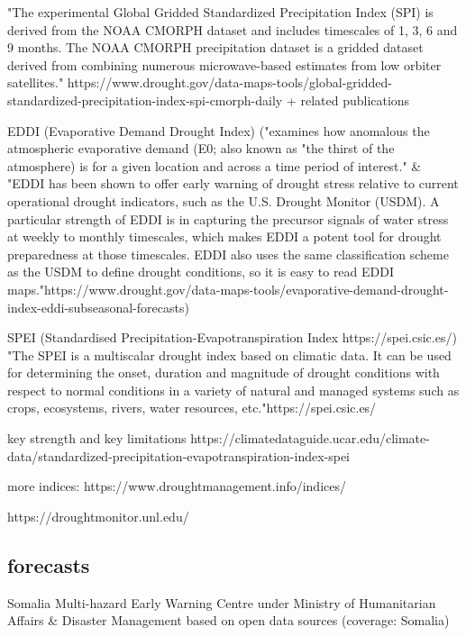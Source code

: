 "The experimental Global Gridded Standardized Precipitation Index (SPI) is derived from the NOAA CMORPH dataset and includes timescales of 1, 3, 6 and 9 months.  The NOAA CMORPH precipitation dataset is a gridded dataset derived from combining numerous microwave-based estimates from low orbiter satellites." https://www.drought.gov/data-maps-tools/global-gridded-standardized-precipitation-index-spi-cmorph-daily + related publications

EDDI (Evaporative Demand Drought Index) ("examines how anomalous the atmospheric evaporative demand (E0; also known as "the thirst of the atmosphere) is for a given location and across a time period of interest." \& "EDDI has been shown to offer early warning of drought stress relative to current operational drought indicators, such as the U.S. Drought Monitor (USDM). A particular strength of EDDI is in capturing the precursor signals of water stress at weekly to monthly timescales, which makes EDDI a potent tool for drought preparedness at those timescales. EDDI also uses the same classification scheme as the USDM to define drought conditions, so it is easy to read EDDI maps."https://www.drought.gov/data-maps-tools/evaporative-demand-drought-index-eddi-subseasonal-forecasts)



SPEI (Standardised Precipitation-Evapotranspiration Index https://spei.csic.es/)
"The SPEI is a multiscalar drought index based on climatic data. It can be used for determining the onset, duration and magnitude of drought conditions with respect to normal conditions in a variety of natural and managed systems such as crops, ecosystems, rivers, water resources, etc."https://spei.csic.es/

key strength and key limitations https://climatedataguide.ucar.edu/climate-data/standardized-precipitation-evapotranspiration-index-spei


more indices: https://www.droughtmanagement.info/indices/

https://droughtmonitor.unl.edu/


\subsection{forecasts}
Somalia Multi-hazard Early Warning Centre under Ministry of Humanitarian Affairs & Disaster Management
based on open data sources (coverage: Somalia)

